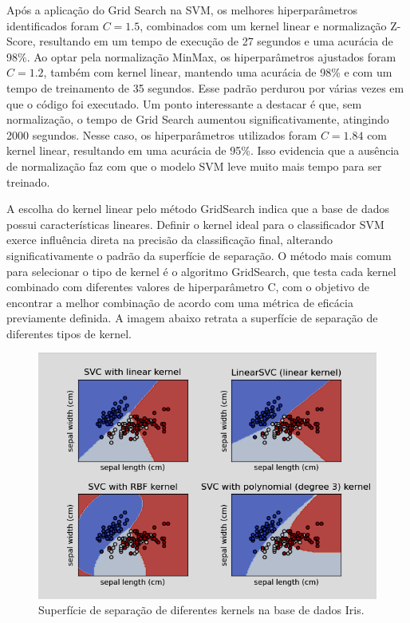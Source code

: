 \documentclass{article} %
\begin{document}
   \vspace{1cm}

   Após a aplicação do Grid Search na SVM, os melhores hiperparâmetros identificados foram \(C = 1.5\), combinados com um kernel linear e normalização Z-Score, resultando em um tempo de execução de 27 segundos e uma acurácia de 98\%. Ao optar pela normalização MinMax, os hiperparâmetros ajustados foram \(C = 1.2\), também com kernel linear, mantendo uma acurácia de 98\% e com um tempo de treinamento de 35 segundos. Esse padrão perdurou por várias vezes em que o código foi executado. Um ponto interessante a destacar é que, sem normalização, o tempo de Grid Search aumentou significativamente, atingindo 2000 segundos. Nesse caso, os hiperparâmetros utilizados foram \(C = 1.84\) com kernel linear, resultando em uma acurácia de 95\%. Isso evidencia que a ausência de normalização faz com que o modelo SVM leve muito mais tempo para ser treinado.

   \vspace{1cm}

   A escolha do kernel linear pelo método GridSearch indica que a base de dados possui características lineares. Definir o kernel ideal para o classificador SVM exerce influência direta na precisão da classificação final, alterando significativamente o padrão da superfície de separação. O método mais comum para selecionar o tipo de kernel é o algoritmo GridSearch, que testa cada kernel combinado com diferentes valores de hiperparâmetro C, com o objetivo de encontrar a melhor combinação de acordo com uma métrica de eficácia previamente definida. A imagem abaixo retrata a superfície de separação de diferentes tipos de kernel.

   \vspace{1cm}

   \begin{figure}[h] %
      \centering %
      \includegraphics[width=0.75\linewidth]{kernel_types.png} %
      \caption{Superfície de separação de diferentes kernels na base de dados Iris.} %
      \label{fig:exemplo} %
   \end{figure}
\end{document}
